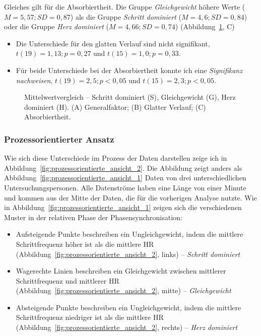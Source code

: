 Gleiches gilt für die Absorbiertheit. Die Gruppe \emph{Gleichgewicht} höhere Werte ($M = 5{,}57; SD = 0{,}87$) als die Gruppe \emph{Schritt dominiert} ($M = 4{,}6; SD = 0{,}84$) oder die Gruppe \emph{Herz dominiert} ($M = 4{,}66; SD = 0{,}74$) (Abbildung~\ref{fig:mittelwert_vergleich}, C)

\begin{itemize}

	\item Die Unterschiede für den glatten Verlauf sind nicht signifikant, $t(19) = 1{,}13; p = 0{,}27$ und $t(15) = 1{,}0; p = 0{,}33$.

	\item Für beide Unterschiede bei der Absorbiertheit konnte ich eine \emph{Signifikanz nachweisen}, $t(19) = 2{,}5; p < 0{,}05$ und $t(15) = 2{,}3; p < 0{,}05$.

\end{itemize}

\begin{figure}[thb!]
	
	\caption[Mittelwertvergleich -- Schritt dominiert, Gleichgewicht, Herz dominiert.]{Mittelwertvergleich -- Schritt dominiert (S), Gleichgewicht (G), Herz dominiert (H). (A) Generalfaktor; (B) Glatter Verlauf; (C) Absorbiertheit.}
	\label{fig:mittelwert_vergleich}
\end{figure}


\subsubsection{Prozessorientierter Ansatz} %
\label{ssub:prozessorientierter_ansatz_5_3}

Wie sich diese Unterschiede im Prozess der Daten darstellen zeige ich in Abbildung~\ref{fig:prozessorientierte_ansicht_2}. Die Abbildung zeigt anders als Abbildung~\ref{fig:prozessorientierte_ansicht_1} Daten von drei unterschiedlichen Untersuchungspersonen. Alle Datenströme haben eine Länge von einer Minute und kommen aus der Mitte der Daten, die für die vorherigen Analyse nutzte. Wie in Abbildung~\ref{fig:prozessorientierte_ansicht_1} zeigen sich die verschiedenen Muster in der relativen Phase der Phasensynchronisation:
\begin{itemize}
	
	\item Aufsteigende Punkte beschreiben ein Ungleichgewicht, indem die mittlere Schrittfrequenz höher ist als die mittlere \ac{HR} (Abbildung~\ref{fig:prozessorientierte_ansicht_2}, links) -- \emph{Schritt dominiert}
	
	\item Wagerechte Linien beschreiben ein Gleichgewicht zwischen mittlerer Schrittfrequenz und mittlerer \ac{HR} (Abbildung~\ref{fig:prozessorientierte_ansicht_2}, mitte) -- \emph{Gleichgewicht}
	
	\item Absteigende Punkte beschreiben ein Ungleichgewicht, indem die mittlere Schrittfrequenz niedriger ist als die mittlere \ac{HR} (Abbildung~\ref{fig:prozessorientierte_ansicht_2}, rechts) -- \emph{Herz dominiert}
\end{itemize} 

